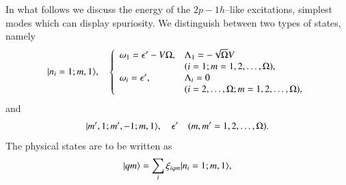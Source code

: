In what follows we discuss the energy of the $2p-1h$--like excitations, simplest modes which can display spuriosity. We
distinguish between two types of states, namely
 \begin{align}\label{eqC1A27} 
|{n_i=1;m,1} \rangle,\quad\left\{
\begin{array}{ll}
\omega_1=\epsilon'-V\Omega, &\Lambda_1=-\sqrt{\Omega}V\\
&(i=1;m=1,2,\dots,\Omega),  \\ 
\omega_i=\epsilon', &\Lambda_i=0\\
&(i=2,\dots,\Omega; m=1,2,\dots,\Omega),
\end{array} \right. 
 \end{align}
and
 \begin{align}\label{eqC1A28} 
|{m',1;m',-1;m,1} \rangle,\quad\epsilon'\quad(m,m'=1,2,\dots,\Omega).
 \end{align}
The physical states are to be written as
 \begin{align}\label{eqC1A29} 
|{qm} \rangle=\sum_i\xi_{iqm}|{n_i=1;m,1} \rangle,
 \end{align}
 
